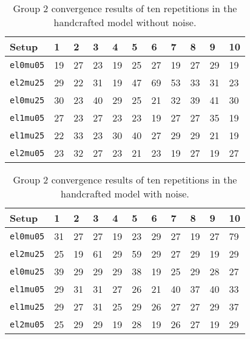 \begin{table}
	\centering
	\begin{tabular}{lllllllllll}
		\hline
		\textbf{Setup} & \textbf{1} & \textbf{2} & \textbf{3} & \textbf{4} & \textbf{5} & \textbf{6} & \textbf{7} & \textbf{8} & \textbf{9} & \textbf{10} \\\hline
		\texttt{el0mu05} & 19 & 27 & 23 & 19 & 25 & 27 & 19 & 27 & 29 & 19 \\
		\texttt{el2mu25} & 29 & 22 & 31 & 19 & 47 & 69 & 53 & 33 & 31 & 23 \\
		\texttt{el0mu25} & 30 & 23 & 40 & 29 & 25 & 21 & 32 & 39 & 41 & 30 \\
		\texttt{el1mu05} & 27 & 23 & 27 & 23 & 23 & 19 & 27 & 27 & 35 & 19 \\
		\texttt{el1mu25} & 22 & 33 & 23 & 30 & 40 & 27 & 29 & 29 & 21 & 19 \\
		\texttt{el2mu05} & 23 & 32 & 27 & 23 & 21 & 23 & 19 & 27 & 19 & 27 \\
	\end{tabular}
	\caption{Group 2 convergence results of ten repetitions in the handcrafted
	model without noise.}
	\label{tab:apx_conv_group2}
\end{table}
\begin{table}
	\centering
	\begin{tabular}{lllllllllll}
		\hline
		\textbf{Setup} & \textbf{1} & \textbf{2} & \textbf{3} & \textbf{4} & \textbf{5} & \textbf{6} & \textbf{7} & \textbf{8} & \textbf{9} & \textbf{10} \\\hline
		\texttt{el0mu05} & 31 & 27 & 27 & 19 & 23 & 29 & 27 & 19 & 27 & 79 \\
		\texttt{el2mu25} & 25 & 19 & 61 & 29 & 59 & 29 & 27 & 29 & 19 & 29 \\
		\texttt{el0mu25} & 39 & 29 & 29 & 29 & 38 & 19 & 25 & 29 & 28 & 27 \\
		\texttt{el1mu05} & 29 & 31 & 31 & 27 & 26 & 21 & 40 & 37 & 40 & 33 \\
		\texttt{el1mu25} & 29 & 27 & 31 & 25 & 29 & 26 & 27 & 27 & 29 & 37 \\
		\texttt{el2mu05} & 25 & 29 & 29 & 19 & 28 & 19 & 26 & 27 & 19 & 29 \\
	\end{tabular}
	\caption{Group 2 convergence results of ten repetitions in the handcrafted
	model with noise.}
	\label{tab:apx_conv_group2_noise}
\end{table}
